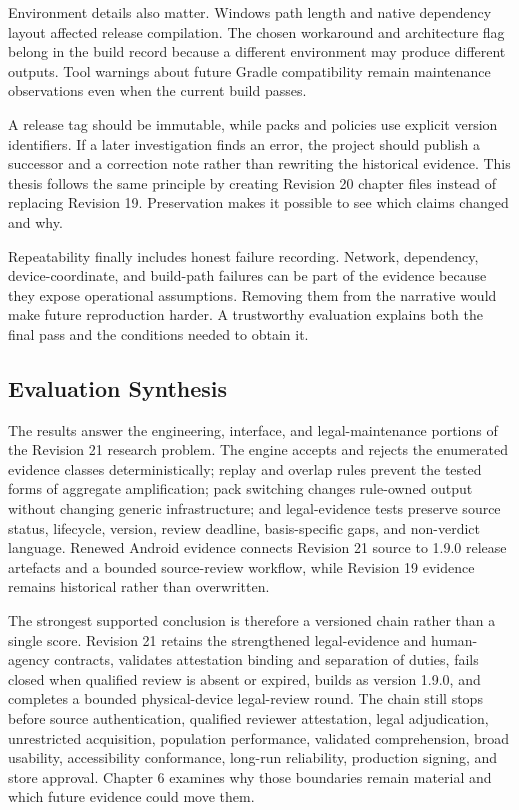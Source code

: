 Environment details also matter. Windows path length and native dependency layout affected release compilation. The chosen workaround and architecture flag belong in the build record because a different environment may produce different outputs. Tool warnings about future Gradle compatibility remain maintenance observations even when the current build passes.

A release tag should be immutable, while packs and policies use explicit version identifiers. If a later investigation finds an error, the project should publish a successor and a correction note rather than rewriting the historical evidence. This thesis follows the same principle by creating Revision 20 chapter files instead of replacing Revision 19. Preservation makes it possible to see which claims changed and why.

Repeatability finally includes honest failure recording. Network, dependency, device-coordinate, and build-path failures can be part of the evidence because they expose operational assumptions. Removing them from the narrative would make future reproduction harder. A trustworthy evaluation explains both the final pass and the conditions needed to obtain it.

\subsection{Evaluation Synthesis}

The results answer the engineering, interface, and legal-maintenance portions of the Revision 21 research problem. The engine accepts and rejects the enumerated evidence classes deterministically; replay and overlap rules prevent the tested forms of aggregate amplification; pack switching changes rule-owned output without changing generic infrastructure; and legal-evidence tests preserve source status, lifecycle, version, review deadline, basis-specific gaps, and non-verdict language. Renewed Android evidence connects Revision 21 source to 1.9.0 release artefacts and a bounded source-review workflow, while Revision 19 evidence remains historical rather than overwritten.

The strongest supported conclusion is therefore a versioned chain rather than a single score. Revision 21 retains the strengthened legal-evidence and human-agency contracts, validates attestation binding and separation of duties, fails closed when qualified review is absent or expired, builds as version 1.9.0, and completes a bounded physical-device legal-review round. The chain still stops before source authentication, qualified reviewer attestation, legal adjudication, unrestricted acquisition, population performance, validated comprehension, broad usability, accessibility conformance, long-run reliability, production signing, and store approval. Chapter 6 examines why those boundaries remain material and which future evidence could move them.
